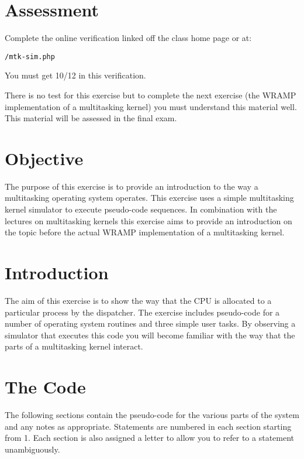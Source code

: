 \documentclass[a4paper,10pt]{article}
\begin{document}

\section{Assessment}

Complete the online verification linked off the class home page or
at:
\begin{center}
   \texttt{\WEBPAGEDIR/mtk-sim.php}
\end{center}


You must get 10/12 in this verification.

There is no test for this exercise but to complete the next exercise
(the WRAMP implementation of a multitasking kernel) you must
understand this material well.  This material will be assessed in the
final exam.

\section{Objective}

The purpose of this exercise is to provide an introduction to the way
a multitasking operating system operates. This exercise uses a simple
multitasking kernel simulator to execute pseudo-code sequences. In
combination with the lectures on multitasking kernels this exercise
aims to provide an introduction on the topic before the actual WRAMP
implementation of a multitasking kernel.

\section{Introduction} 

The aim of this exercise is to show the way that the CPU is
allocated to a particular process by the dispatcher. The exercise
includes pseudo-code for a number of operating system routines and
three simple user tasks.  By observing a simulator that
executes this code you will become familiar with the way that the
parts of a multitasking kernel interact.

\section{The Code}
The following sections contain the pseudo-code for the various parts
of the system and any notes as appropriate. Statements are numbered in
each section starting from 1.  Each section is also assigned a letter
to allow you to refer to a statement unambiguously.  
\end{document}
